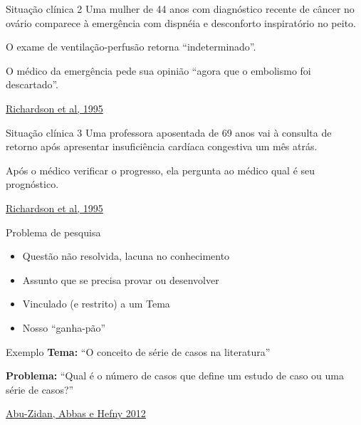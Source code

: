 \documentclass{beamer}
\begin{document}
\begin{frame}
  \begin{exampleblock}{Situação clínica 2}
    \footnotesize
    Uma mulher de 44 anos com diagnóstico recente de câncer no ovário comparece à emergência com dispnéia e desconforto inspiratório no peito.

    \bigskip
    O exame de ventilação-perfusão retorna ``indeterminado''.

    \bigskip
    O médico da emergência pede sua opinião ``agora que o embolismo foi descartado''.
  \end{exampleblock}

  \vfill
  \scriptsize
  \hfill \href{https://acpjc.acponline.org/Content/123/3/issue/ACPJC-1995-123-3-A12.htm}
      {Richardson et al, 1995}
\end{frame}

\begin{frame}
  \begin{exampleblock}{Situação clínica 3}
    \footnotesize
    Uma professora aposentada de 69 anos vai à consulta de retorno após apresentar insuficiência cardíaca congestiva um mês atrás.

    \bigskip
    Após o médico verificar o progresso, ela pergunta ao médico qual é seu prognóstico.
  \end{exampleblock}

  \vfill
  \scriptsize
  \hfill \href{https://acpjc.acponline.org/Content/123/3/issue/ACPJC-1995-123-3-A12.htm}
      {Richardson et al, 1995}
\end{frame}

\begin{frame}{Problema de pesquisa}
  \begin{itemize}
    \footnotesize
  \item Questão não resolvida, lacuna no conhecimento
    \bigskip
  \item Assunto que se precisa provar ou desenvolver
    \bigskip
  \item Vinculado (e restrito) a um Tema
    \bigskip
  \item Nosso ``ganha-pão''
  \end{itemize}
\end{frame}

\begin{frame}
  \begin{exampleblock}{Exemplo}
    \small
    {\bf Tema:} ``O conceito de série de casos na literatura''

    \bigskip

    {\bf Problema:} ``Qual é o número de casos que define um estudo de caso ou uma série de casos?''
  \end{exampleblock}

  \vfill
  \scriptsize
  \hfill \href{http://dx.doi.org/10.4314/ahs.v12i4.25}{Abu-Zidan, Abbas e Hefny 2012}
\end{frame}
\end{document}
